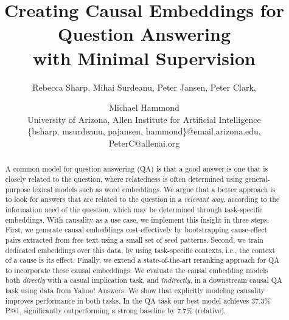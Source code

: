 \documentclass[11pt,letterpaper]{article}
\title{Creating Causal Embeddings for Question Answering \\with Minimal Supervision
}
\author{Rebecca Sharp, Mihai Surdeanu, Peter Jansen, Peter Clark, \and Michael Hammond \\ University of Arizona, Allen Institute for Artificial Intelligence \\ \{bsharp, msurdeanu, pajansen, hammond\}@email.arizona.edu, PeterC@allenai.org}
\newcommand{\todo}[1]{\textcolor{red}{TODO: #1}}
\begin{document}
\vspace{-5mm}
\maketitle

%

\begin{abstract}
A common model for question answering (QA) is that a good answer is one that is closely related to the question, where relatedness is often determined using general-purpose lexical models such as word embeddings. 
We argue that a better approach is to look for answers that are related to the question in a {\em relevant way}, according to the information need of the question,
which may be determined through task-specific embeddings. 
With causality as a use case, we implement this insight in three steps. First, we generate causal embeddings cost-effectively by bootstrapping cause-effect pairs extracted from free text using a small set of seed patterns. Second, we train dedicated embeddings over this data, by using task-specific contexts, i.e., the context of a cause is its effect. Finally, we extend a state-of-the-art reranking approach for QA to incorporate these causal embeddings. We evaluate the causal embedding models both \emph{directly} with a casual implication task,
 and \emph{indirectly}, in a downstream causal QA task using data from Yahoo! Answers. We show that explicitly modeling causality improves performance in both tasks. In the QA task our best model achieves 37.3\% P@1, significantly outperforming a strong baseline by 7.7\% (relative). 


\end{abstract}
\end{document}
